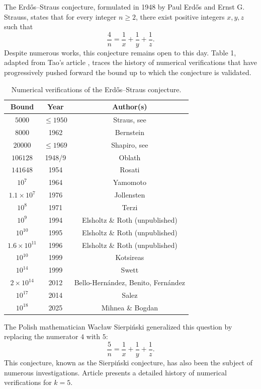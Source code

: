 \documentclass[12pt]{article}
\begin{document}
The Erdős--Straus conjecture, formulated in 1948 by Paul Erdős and Ernst G. Strauss, states that for every integer \(n\ge 2\), there exist positive integers \(x,y,z\) such that
\[
\frac{4}{n} = \frac{1}{x} + \frac{1}{y} + \frac{1}{z}. \tag{1}
\]
Despite numerous works, this conjecture remains open to this day. Table 1, adapted from Tao's article \cite{2}, traces the history of numerical verifications that have progressively pushed forward the bound up to which the conjecture is validated.
\begin{table}[htbp]
\centering
\begin{tabular}{|c|c|c|}
\hline
\textbf{Bound} & \textbf{Year} & \textbf{Author(s)} \\
\hline
\(5000\) & \(\leqslant 1950\) & Straus, see \cite{3} \\
\(8000\) & 1962 & Bernstein \cite{4} \\
\(20000\) & \(\leqslant 1969\) & Shapiro, see \cite{5} \\
\(106128\) & 1948/9 & Oblath \cite{6} \\
\(141648\) & 1954 & Rosati \cite{7} \\
\(10^{7}\) & 1964 & Yamomoto \cite{8} \\
\(1.1\times 10^{7}\) & 1976 & Jollensten \cite{9} \\
\(10^{8}\) & 1971 & Terzi \cite{10} \\
\(10^{9}\) & 1994 & Elsholtz \& Roth (unpublished) \\
\(10^{10}\) & 1995 & Elsholtz \& Roth (unpublished) \\
\(1.6\times 10^{11}\) & 1996 & Elsholtz \& Roth (unpublished) \\
\(10^{10}\) & 1999 & Kotsireas \cite{11} \\
\(10^{14}\) & 1999 & Swett \cite{12} \\
\(2\times 10^{14}\) & 2012 & Bello-Hernández, Benito, Fernández \cite{13} \\
\(10^{17}\) & 2014 & Salez \cite{14} \\
\(10^{18}\) & 2025 & Mihnea \& Bogdan \cite{15} \\
\hline
\end{tabular}
\caption{Numerical verifications of the Erdős--Straus conjecture.}
\end{table}

The Polish mathematician Wacław Sierpiński generalized this question by replacing the numerator \(4\) with \(5\):
\[
\frac{5}{n} = \frac{1}{x} + \frac{1}{y} + \frac{1}{z}. \tag{2}
\]
This conjecture, known as the Sierpiński conjecture, has also been the subject of numerous investigations. Article \cite{16} presents a detailed history of numerical verifications for \(k=5\).
\end{document}
